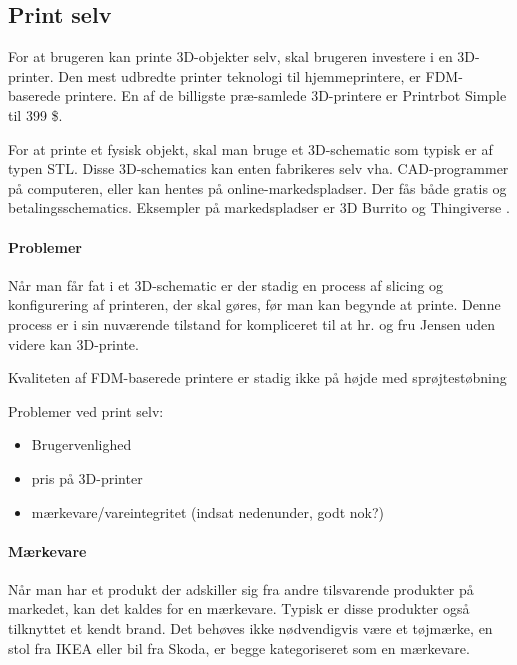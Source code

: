 \subsection{Print selv} %
\label{sub:print_selv}


For at brugeren kan printe 3D-objekter selv, skal brugeren investere i en 3D-printer. Den mest udbredte printer teknologi til hjemmeprintere, er FDM-baserede printere. En af de billigste præ-samlede 3D-printere er Printrbot Simple til 399 \$. \autocite{_assembled_????}

For at printe et fysisk objekt, skal man bruge et 3D-schematic som typisk er af typen STL. Disse 3D-schematics kan enten fabrikeres selv vha. CAD-programmer på computeren, eller kan hentes på online-markedspladser. Der fås både gratis og betalingsschematics. Eksempler på markedspladser er 3D Burrito \autocite{_3d_2013-1} og Thingiverse \autocite{_thingiverse_????}.


\paragraph{Problemer} %
\label{par:problemer_mangler}

Når man får fat i et 3D-schematic er der stadig en process af slicing og konfigurering af printeren, der skal gøres, før man kan begynde at printe. Denne process er i sin nuværende tilstand for kompliceret til at hr. og fru Jensen uden videre kan 3D-printe.

Kvaliteten af FDM-baserede printere er stadig ikke på højde med sprøjtestøbning




Problemer ved print selv:

\begin{itemize}
	\item Brugervenlighed
	\item pris på 3D-printer
	\item mærkevare/vareintegritet (indsat nedenunder, godt nok?)
\end{itemize}

\paragraph{Mærkevare}

Når man har et produkt der adskiller sig fra andre tilsvarende produkter på markedet, kan det kaldes for en mærkevare. Typisk er disse produkter også tilknyttet et kendt brand.
Det behøves ikke nødvendigvis være et tøjmærke, en stol fra IKEA eller bil fra Skoda, er begge kategoriseret som en mærkevare. 

